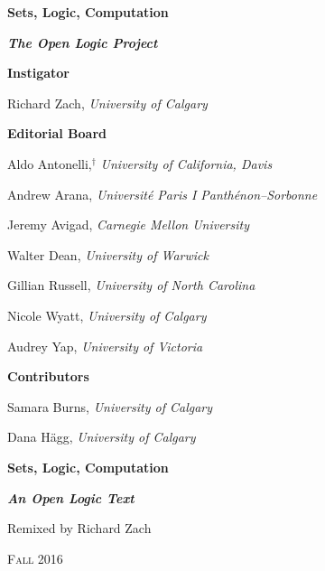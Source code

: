 %

\problemsperchapter

\frontmatter


\pagestyle{empty}

\vspace*{100pt}

\begin{raggedleft}
{\fontsize{24pt}{24pt}\selectfont\bfseries\sffamily%
  Sets, Logic, Computation}
\end{raggedleft}


\newpage


\vspace*{100pt}

{\bfseries\itshape The Open Logic Project}

\bigskip

\textbf{\color{leadbeater}Instigator}

\medskip

Richard Zach, \emph{University of Calgary}

\bigskip

\textbf{\color{leadbeater}Editorial Board}

\medskip

Aldo Antonelli,$^\dagger$ \emph{University of California, Davis}

Andrew Arana, \emph{Universit\'e Paris I Panth\'enon--Sorbonne}

Jeremy Avigad, \emph{Carnegie Mellon University}

Walter Dean, \emph{University of Warwick}

Gillian Russell, \emph{University of North Carolina}

Nicole Wyatt, \emph{University of Calgary}

Audrey Yap, \emph{University of Victoria}

\bigskip

\textbf{\color{leadbeater}Contributors}

\medskip

Samara Burns, \emph{University of Calgary}

Dana H\"agg, \emph{University of Calgary}

\newpage


\vspace*{100pt}

\begin{raggedleft}

{\fontsize{24pt}{24pt}\selectfont\bfseries\sffamily%
  Sets, Logic, Computation}

\smallskip

{\fontsize{18pt}{18pt}\selectfont\bfseries\itshape An Open Logic Text}

\vspace{100pt}

\fontsize{14pt}{14pt}\selectfont Remixed by Richard Zach

\vfill

\textsc{Fall 2016} %

\end{raggedleft}


